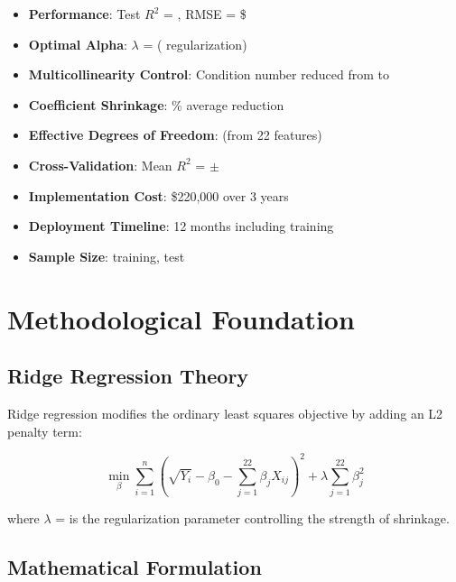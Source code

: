 \begin{itemize}
    \item \textbf{Performance}: Test $R^2$ = \ModelFiveRSquaredTest, RMSE = \$\ModelFiveRMSETest
    \item \textbf{Optimal Alpha}: $\lambda$ = \ModelFiveAlpha{} (\ModelFiveRegularizationStrength{} regularization)
    \item \textbf{Multicollinearity Control}: Condition number reduced from \ModelFiveConditionNumberBefore{} to \ModelFiveConditionNumberAfter{}
    \item \textbf{Coefficient Shrinkage}: \ModelFiveShrinkageFactor{}\% average reduction
    \item \textbf{Effective Degrees of Freedom}: \ModelFiveEffectiveDf{} (from 22 features)
    \item \textbf{Cross-Validation}: Mean $R^2$ = \ModelFiveCVMean{} $\pm$ \ModelFiveCVStd{}
    \item \textbf{Implementation Cost}: \$220,000 over 3 years
    \item \textbf{Deployment Timeline}: 12 months including training
    \item \textbf{Sample Size}: \ModelFiveTrainingSamples{} training, \ModelFiveTestSamples{} test
\end{itemize}

\section{Methodological Foundation}

\subsection{Ridge Regression Theory}

Ridge regression modifies the ordinary least squares objective by adding an L2 penalty term:

\begin{equation}
\min_{\beta} \sum_{i=1}^n \left(\sqrt{Y_i} - \beta_0 - \sum_{j=1}^{22} \beta_j X_{ij}\right)^2 + \lambda \sum_{j=1}^{22} \beta_j^2
\end{equation}

where $\lambda$ = \ModelFiveAlpha{} is the regularization parameter controlling the strength of shrinkage.

\subsection{Mathematical Formulation}

